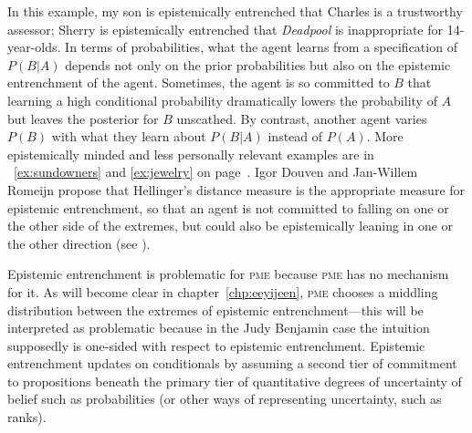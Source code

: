 \documentclass[phd,12pt,oneside]{ubcthesis}
\begin{document}
In this example, my son is epistemically entrenched that Charles is a
trustworthy assessor; Sherry is epistemically entrenched that
\emph{Deadpool} is inappropriate for 14-year-olds. In terms of
probabilities, what the agent learns from a specification of $P(B|A)$
depends not only on the prior probabilities but also on the epistemic
entrenchment of the agent. Sometimes, the agent is so committed to $B$
that learning a high conditional probability dramatically lowers the
probability of $A$ but leaves the posterior for $B$ unscathed. By
contrast, another agent varies $P(B)$ with what they learn about
$P(B|A)$ instead of $P(A)$. More epistemically minded and less
personally relevant examples are in {\xamples}~\ref{ex:sundowners} and
\ref{ex:jewelry} on page~\pageref{page:oquohsae}. Igor Douven and
Jan-Willem Romeijn propose that Hellinger's distance measure is the
appropriate measure for epistemic entrenchment, so that an agent is
not committed to falling on one or the other side of the extremes, but
could also be epistemically leaning in one or the other direction (see
).

Epistemic entrenchment is problematic for \textsc{pme} because
\textsc{pme} has no mechanism for it. As will become clear in
chapter~\ref{chp:eeyijeen}, \textsc{pme} chooses a middling
distribution between the extremes of epistemic entrenchment---this
will be interpreted as problematic because in the Judy Benjamin case
the intuition supposedly is one-sided with respect to epistemic
entrenchment. Epistemic entrenchment updates on conditionals by
assuming a second tier of commitment to propositions beneath the
primary tier of quantitative degrees of uncertainty of belief such as
probabilities (or other ways of representing uncertainty, such as
ranks). 
\end{document}
